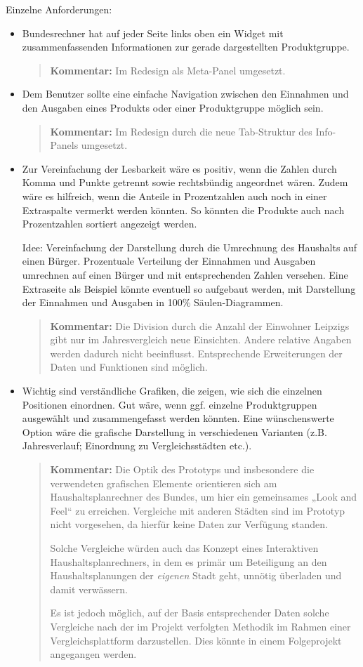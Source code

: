 \documentclass[11pt,a4paper,twoside]{article}
\newcommand{\kommentar}[1]{\begin{quote}\textbf{Kommentar:} #1 \end{quote}}
\begin{document}
Einzelne Anforderungen:
\begin{itemize}\itemsep0pt
\item Bundesrechner hat auf jeder Seite links oben ein Widget mit
  zusammenfassenden Informationen zur gerade dargestellten Produktgruppe.

  \kommentar{Im Redesign als Meta-Panel umgesetzt. }
\item Dem Benutzer sollte eine einfache Navigation zwischen den Einnahmen und
  den Ausgaben eines Produkts oder einer Produktgruppe möglich sein.

  \kommentar{Im Redesign durch die neue Tab-Struktur des Info-Panels
    umgesetzt.}
\item Zur Vereinfachung der Lesbarkeit wäre es positiv, wenn die Zahlen durch
  Komma und Punkte getrennt sowie rechtsbündig angeordnet wären. Zudem wäre es
  hilfreich, wenn die Anteile in Prozentzahlen auch noch in einer Extraspalte
  vermerkt werden könnten.  So könnten die Produkte auch nach Prozentzahlen
  sortiert angezeigt werden.

  Idee: Vereinfachung der Darstellung durch die Umrechnung des Haushalts
  auf einen Bürger.  Prozentuale Verteilung der Einnahmen und Ausgaben
  umrechnen auf einen Bürger und mit entsprechenden Zahlen versehen. Eine
  Extraseite als Beispiel könnte eventuell so aufgebaut werden, mit
  Darstellung der Einnahmen und Ausgaben in 100\% Säulen-Diagrammen.

  \kommentar{Die Division durch die Anzahl der Einwohner Leipzigs gibt nur im
    Jahresvergleich neue Einsichten.  Andere relative Angaben werden dadurch
    nicht beeinflusst.  Entsprechende Erweiterungen der Daten und Funktionen
    sind möglich. }

\item Wichtig sind verständliche Grafiken, die zeigen, wie sich die einzelnen
  Positionen einordnen. Gut wäre, wenn ggf. einzelne Produktgruppen ausgewählt
  und zusammengefasst werden könnten. Eine wünschenswerte Option wäre die
  grafische Darstellung in verschiedenen Varianten (z.B. Jahresverlauf;
  Einordnung zu Vergleichsstädten etc.).

\kommentar{Die Optik des Prototyps und insbesondere die verwendeten grafischen
  Elemente orientieren sich am Haushaltsplanrechner des Bundes, um hier ein
  gemeinsames „Look and Feel“ zu erreichen.  Vergleiche mit anderen Städten 
  sind im Prototyp nicht vorgesehen, da hierfür keine Daten zur Verfügung
  standen.  

  Solche Vergleiche würden auch das Konzept eines Interaktiven
  Haushaltsplanrechners, in dem es primär um Beteiligung an den
  Haushaltsplanungen der \emph{eigenen} Stadt geht, unnötig überladen und
  damit verwässern.

  Es ist jedoch möglich, auf der Basis entsprechender Daten solche Vergleiche
  nach der im Projekt verfolgten Methodik im Rahmen einer Vergleichsplattform
  darzustellen.  Dies könnte in einem Folgeprojekt angegangen werden.} 
\end{itemize}
\end{document}
